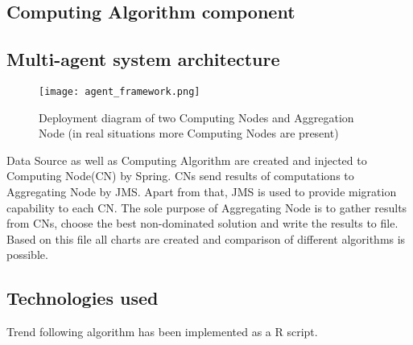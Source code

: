 \subsection{Computing Algorithm component}



\subsection{Multi-agent system architecture}

\newpage
\begin{figure}[!ht]
  \begin{center}
    \texttt{[image: agent\_framework.png]}
  \end{center}
  \caption{Deployment diagram of two Computing Nodes and Aggregation Node (in real situations more Computing Nodes are present)}
\end{figure}

Data Source as well as Computing Algorithm are created and injected to Computing Node(CN) by Spring. 
CNs send results of computations to Aggregating Node by JMS. 
Apart from that, JMS is used to provide migration capability to each CN.
The sole purpose of Aggregating Node is to gather results from CNs, choose the best non-dominated solution and write the results to file. 
Based on this file all charts are created and comparison of different algorithms is possible.

  

\subsection{Technologies used}

Trend following algorithm has been implemented as a R script.






